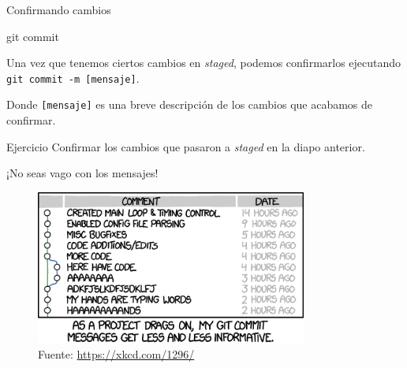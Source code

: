 \begin{frame}[t]{Confirmando cambios}
    \begin{comando}
        git commit
    \end{comando}

    \pause
    \begin{block}{}
        Una vez que tenemos ciertos cambios en \textit{staged}, podemos confirmarlos
        ejecutando \texttt{git commit -m [mensaje]}.

        \vspace{0.5em}

        Donde \texttt{[mensaje]} es una breve descripción de los cambios que acabamos de confirmar.
    \end{block}

    \pause
    \vspace{1em}
    \begin{ejercicio}{Ejercicio}
        Confirmar los cambios que pasaron a \textit{staged} en la diapo anterior.
    \end{ejercicio}
\end{frame}

\begin{frame}[t]{¡No seas vago con los mensajes!}

    \begin{figure}[ht]
        \begin{center}
            \includegraphics[height=2in]{images/xkcd-git-commit.png}
        \end{center}
        \caption{Fuente: \url{https://xkcd.com/1296/}}
    \end{figure}

\end{frame}

